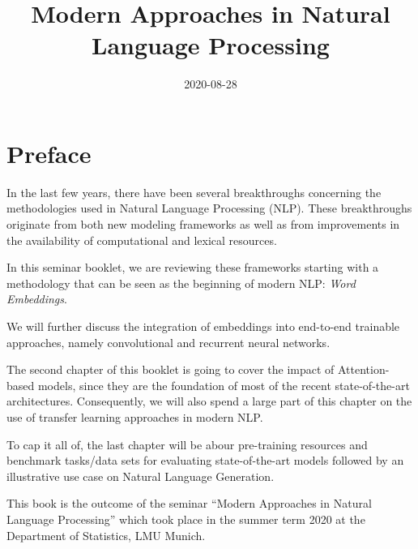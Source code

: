 \documentclass[]{krantz}
\title{Modern Approaches in Natural Language Processing}
\author{}
\date{\vspace{-2.5em}2020-08-28}
\begin{document}
\maketitle


\thispagestyle{empty}

\begin{center}
\end{center}

\setlength{\abovedisplayskip}{-5pt}
\setlength{\abovedisplayshortskip}{-5pt}

{
\hypersetup{linkcolor=}
\setcounter{tocdepth}{0}
\tableofcontents
}
\hypertarget{preface}{%
\chapter*{Preface}\label{preface}}


In the last few years, there have been several breakthroughs concerning the methodologies used in Natural Language Processing (NLP). These breakthroughs originate from both new modeling frameworks as well as from improvements in the availability of computational and lexical resources.

In this seminar booklet, we are reviewing these frameworks starting with a methodology that can be seen as the beginning of modern NLP: \emph{Word Embeddings}.

We will further discuss the integration of embeddings into end-to-end trainable approaches, namely convolutional and recurrent neural networks.

The second chapter of this booklet is going to cover the impact of Attention-based models, since they are the foundation of most of the recent state-of-the-art architectures. Consequently, we will also spend a large part of this chapter on the use of transfer learning approaches in modern NLP.

To cap it all of, the last chapter will be abour pre-training resources and benchmark tasks/data sets for evaluating state-of-the-art models followed by an illustrative use case on Natural Language Generation.

This book is the outcome of the seminar ``Modern Approaches in Natural Language Processing'' which took place in the summer term 2020 at the Department of Statistics, LMU Munich.
\end{document}
